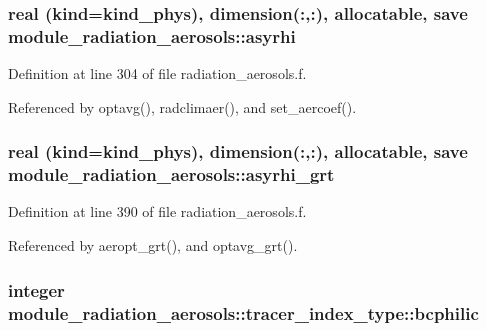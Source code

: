 \subsubsection[{\texorpdfstring{asyrhi}{asyrhi}}]{\setlength{\rightskip}{0pt plus 5cm}real (kind=kind\+\_\+phys), dimension(\+:,\+:), allocatable, save module\+\_\+radiation\+\_\+aerosols\+::asyrhi\hspace{0.3cm}{\ttfamily [private]}}\hypertarget{group__module__radiation__aerosols_gaac2d735c117dd7d1e72264e611764f79}{}\label{group__module__radiation__aerosols_gaac2d735c117dd7d1e72264e611764f79}


Definition at line 304 of file radiation\+\_\+aerosols.\+f.



Referenced by optavg(), radclimaer(), and set\+\_\+aercoef().

\subsubsection[{\texorpdfstring{asyrhi\+\_\+grt}{asyrhi_grt}}]{\setlength{\rightskip}{0pt plus 5cm}real (kind=kind\+\_\+phys), dimension(\+:,\+:), allocatable, save module\+\_\+radiation\+\_\+aerosols\+::asyrhi\+\_\+grt\hspace{0.3cm}{\ttfamily [private]}}\hypertarget{group__module__radiation__aerosols_ga4b5f80817af9f2116618d6c8f0e194de}{}\label{group__module__radiation__aerosols_ga4b5f80817af9f2116618d6c8f0e194de}


Definition at line 390 of file radiation\+\_\+aerosols.\+f.



Referenced by aeropt\+\_\+grt(), and optavg\+\_\+grt().

\subsubsection[{\texorpdfstring{bcphilic}{bcphilic}}]{\setlength{\rightskip}{0pt plus 5cm}integer module\+\_\+radiation\+\_\+aerosols\+::tracer\+\_\+index\+\_\+type\+::bcphilic\hspace{0.3cm}{\ttfamily [private]}}\hypertarget{group__module__radiation__aerosols_ga776ae744bfaad492a1aeccf32864d1a0}{}\label{group__module__radiation__aerosols_ga776ae744bfaad492a1aeccf32864d1a0}


